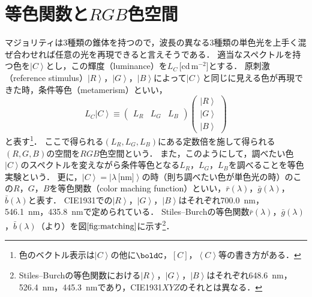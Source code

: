 \documentclass[uplatex,paper=a4,fontsize=4.0truemm,jafontsize=4.0truemm,head_space=30.0truemm,foot_space=30.0truemm,baselineskip=8.0truemm,line_length=40zw,gutter=25.0truemm,oneside,openany,fleqn,hanging_panctuation,open_bracket_pos=nibu_tentsuki,dvipdfmx,jis2004,book,titlepage]{jlreq}
\theoremstyle{mystyle}
\newcommand{\mathdisplaystyle}[1]{\(\displaystyle{#1}\)}
\newcommand{\Reference}[1]{\mathdisplaystyle{\ref{#1}}}
\newcommand{\negativevalue}[1]{{-#1}}
\newcommand{\parentheses}[1]{\left(#1\right)}
\newcommand{\squarebrackets}[1]{\left[#1\right]}
\newcommand{\anglebrackets}[1]{\left\langle#1\right\rangle}
\newcommand{\Diracket}[1]{\left\lvert#1\right\rangle}
\newcommand{\easymatrix}[1]{\mathord{\begin{pmatrix}#1\end{pmatrix}}}
\begin{document}
		\section{等色関数と\mathdisplaystyle{RGB}色空間}
			マジョリティは3種類の錐体を持つので，波長の異なる3種類の単色光を上手く混ぜ合わせれば任意の光を再現できると言えそうである．
			適当なスペクトルを持つ色を\mathdisplaystyle{\Diracket{C}}とし，この輝度（luminance）を\mathdisplaystyle{L_C}\,[cd\,\mathdisplaystyle{\textrm{m}^\negativevalue{2}}]とする．
			原刺激（reference stimulus）\mathdisplaystyle{\Diracket{R}}，\mathdisplaystyle{\Diracket{G}}，\mathdisplaystyle{\Diracket{B}}によって\mathdisplaystyle{\Diracket{C}}と同じに見える色が再現できた時，条件等色（metamerism）といい，
			\begin{equation*}
				L_C\Diracket{C}\equiv \easymatrix{L_R & L_G & L_B}\easymatrix{\Diracket{R} \\ \Diracket{G} \\ \Diracket{B}}
			\end{equation*}
			と表す\footnote{色のベクトル表示は\mathdisplaystyle{\Diracket{C}}の他に\mathdisplaystyle{\boldC}，\mathdisplaystyle{\squarebrackets{C}}，\mathdisplaystyle{\anglebrackets{C}}等の書き方がある．}．
			ここで得られる\mathdisplaystyle{\parentheses{L_R,L_G,L_B}}にある定数倍を施して得られる\mathdisplaystyle{\parentheses{R,G,B}}の空間を\mathdisplaystyle{RGB}色空間という．
			また，このようにして，調べたい色\mathdisplaystyle{\Diracket{C}}のスペクトルを変えながら条件等色となる\mathdisplaystyle{L_R}，\mathdisplaystyle{L_G}，\mathdisplaystyle{L_B}を調べることを等色実験という．
			更に，\mathdisplaystyle{\Diracket{C}=\Diracket{\lambda\,\textrm{[nm]}}}の時（則ち調べたい色が単色光の時）のこの\mathdisplaystyle{R}，\mathdisplaystyle{G}，\mathdisplaystyle{B}を等色関数（color maching function）といい，\mathdisplaystyle{\bar{r}\parentheses{\lambda}}，\mathdisplaystyle{\bar{g}\parentheses{\lambda}}，\mathdisplaystyle{\bar{b}\parentheses{\lambda}}と表す．
			CIE1931での\mathdisplaystyle{\Diracket{R}}，\mathdisplaystyle{\Diracket{G}}，\mathdisplaystyle{\Diracket{B}}はそれぞれ\SI{700.0}{nm}，\SI{546.1}{nm}，\SI{435.8}{nm}で定められている．
			Stiles--Burchの等色関数\mathdisplaystyle{\bar{r}\parentheses{\lambda}}，\mathdisplaystyle{\bar{g}\parentheses{\lambda}}，\mathdisplaystyle{\bar{b}\parentheses{\lambda}}（\cite{Stiles1955,Stiles1959}より）を図\Reference{fig:matching}に示す\footnote{Stiles--Burchの等色関数における\mathdisplaystyle{\Diracket{R}}，\mathdisplaystyle{\Diracket{G}}，\mathdisplaystyle{\Diracket{B}}はそれぞれ\SI{648.6}{nm}，\SI{526.4}{nm}，\SI{445.3}{nm}であり，CIE1931\mathdisplaystyle{XYZ}のそれとは異なる．}．
\end{document}
